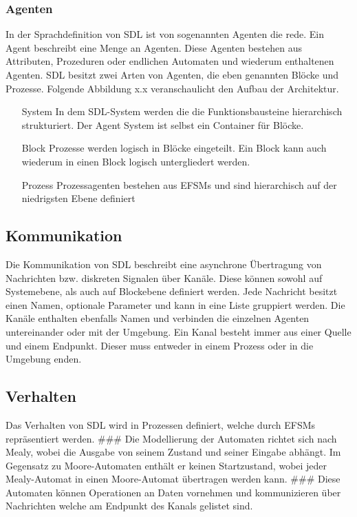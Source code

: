 \subsubsection{Agenten}
In der Sprachdefinition von \ac{SDL} ist von sogenannten Agenten die rede. Ein Agent beschreibt eine Menge an Agenten. Diese Agenten bestehen aus Attributen, Prozeduren oder endlichen Automaten und wiederum enthaltenen Agenten. \ac{SDL} besitzt zwei Arten von Agenten, die eben genannten Blöcke und Prozesse. Folgende Abbildung x.x veranschaulicht den Aufbau der Architektur.
\begin{itemize}
\item[System] In dem \ac{SDL}-System werden die die Funktionsbausteine hierarchisch strukturiert. Der Agent System ist selbst ein Container für Blöcke. 
\item[Block] Prozesse werden logisch in Blöcke eingeteilt. Ein Block kann auch wiederum in einen Block logisch untergliedert werden.
\item[Prozess] Prozessagenten bestehen aus \ac{EFSM}s und sind hierarchisch auf der niedrigsten Ebene definiert 
\end{itemize}

\subsection{Kommunikation}
\label{ssc:Kommunikation}
Die Kommunikation von \ac{SDL} beschreibt eine asynchrone Übertragung von Nachrichten bzw. diskreten Signalen über Kanäle. Diese können sowohl auf Systemebene, als auch auf Blockebene definiert werden. Jede Nachricht besitzt einen Namen, optionale Parameter und kann in eine Liste gruppiert werden. 
Die Kanäle enthalten ebenfalls Namen und verbinden die einzelnen Agenten untereinander oder mit der Umgebung. Ein Kanal besteht immer aus einer Quelle und einem Endpunkt. Dieser muss entweder in einem Prozess oder in die Umgebung enden. 

\subsection{Verhalten}
\label{ssc:Verhalten}
Das Verhalten von \ac{SDL} wird in Prozessen definiert, welche durch \ac{EFSM}s repräsentiert werden.
###
Die Modellierung der Automaten richtet sich nach Mealy, wobei die Ausgabe von seinem Zustand und seiner Eingabe abhängt. Im Gegensatz zu Moore-Automaten enthält er keinen Startzustand, wobei jeder Mealy-Automat in einen Moore-Automat übertragen werden kann.
###
Diese Automaten können Operationen an Daten vornehmen und kommunizieren über Nachrichten welche am Endpunkt des Kanals gelistet sind.


